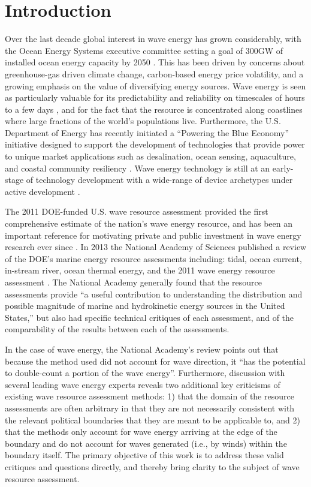 \section{Introduction}

Over the last decade global interest in wave energy has grown
considerably, with the Ocean Energy Systems executive committee
setting a goal of 300GW of installed ocean energy capacity by 2050
\citep[]{huckerbyInternationalVisionOcean2017}. This has been driven
by concerns about greenhouse-gas driven climate change, carbon-based
energy price volatility, and a growing emphasis on the value of
diversifying energy sources. Wave energy is seen as particularly
valuable for its predictability and reliability on timescales of hours
to a few days \citep{parkinsonIntegratingOceanWave2015}, and for the
fact that the resource is concentrated along coastlines where large
fractions of the world's populations live. Furthermore, the
U.S. Department of Energy has recently initiated a ``Powering the Blue
Economy'' initiative designed to support the development of
technologies that provide power to unique market applications such as
desalination, ocean sensing, aquaculture, and coastal community
resiliency \citep{PBE_REPORT}. Wave energy technology is still at an
early-stage of technology development with a wide-range of device
archetypes under active development
\citep[]{babaritOceanWaveEnergy2017}.

The 2011 DOE-funded U.S. wave resource assessment provided the first
comprehensive estimate of the nation’s wave energy resource, and has
been an important reference for motivating private and public
investment in wave energy research ever since
\citep[]{EPRIwaveresource2011}. In 2013 the National Academy of
Sciences published a review of the DOE’s marine energy resource
assessments including: tidal, ocean current, in-stream river, ocean
thermal energy, and the 2011 wave energy resource assessment
\citep{nationalresearchcouncilEvaluationDepartmentEnergy2013}.  The
National Academy generally found that the resource assessments provide
“a useful contribution to understanding the distribution and possible
magnitude of marine and hydrokinetic energy sources in the United
States,” but also had specific technical critiques of each assessment,
and of the comparability of the results between each of the
assessments.

In the case of wave energy, the National Academy’s review points out that
because the method used did not account for wave direction, it ``has the
potential to double-count a portion of the wave energy''. Furthermore, discussion with several leading wave energy experts reveals two additional key criticisms of existing wave resource assessment methods: 1) that the domain of the resource assessments are often arbitrary in that they are not necessarily consistent with the relevant political boundaries that they are meant to be applicable to, and 2) that the methods only account for wave energy arriving at the edge of the boundary and do not account for waves generated (i.e., by winds) within the boundary itself.
The primary objective of this work is to address these valid critiques and questions directly, and thereby bring clarity to the subject of wave resource assessment.

